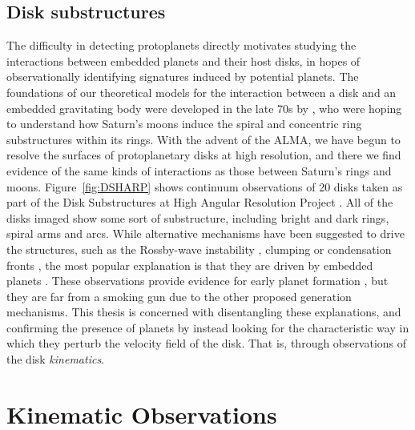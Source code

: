 \subsection{Disk substructures}

The difficulty in detecting protoplanets directly motivates studying the interactions between embedded planets and their host disks, in hopes of observationally identifying signatures induced by potential planets.
The foundations of our theoretical models for the interaction between a disk and an embedded gravitating body were developed in the late 70s by \citet{goldreich1978,goldreich1979,goldreich1980}, who were hoping to understand how Saturn's moons induce the spiral and concentric ring substructures within its rings.
With the advent of the ALMA, we have begun to resolve the surfaces of protoplanetary disks at high resolution, and there we find evidence of the same kinds of interactions as those between Saturn's rings and moons.
Figure~\ref{fig:DSHARP} shows continuum observations of 20 disks taken as part of the Disk Substructures at High Angular Resolution Project \citep[DSHARP;][]{andrews2018}.
All of the disks imaged show some sort of substructure, including bright and dark rings, spiral arms and arcs.
While alternative mechanisms have been suggested to drive the structures, such as the Rossby-wave instability \citep{pinilla2012}, clumping \citep{lyra2013} or condensation fronts \citep{zhang2015a}, the most popular explanation is that they are driven by embedded planets \citep{dipierro2015,dong2015b,bae2017,fedele2017,fedele2018,zhang2018}.
These observations provide evidence for early planet formation \citep[e.g. fully formed planets in HL Tau with age $<1$ Myr, see][]{dipierro2015}, but they are far from a smoking gun due to the other proposed generation mechanisms.
This thesis is concerned with disentangling these explanations, and confirming the presence of planets by instead looking for the characteristic way in which they perturb the velocity field of the disk.
That is, through observations of the disk \textit{kinematics}.

\section{Kinematic Observations}

